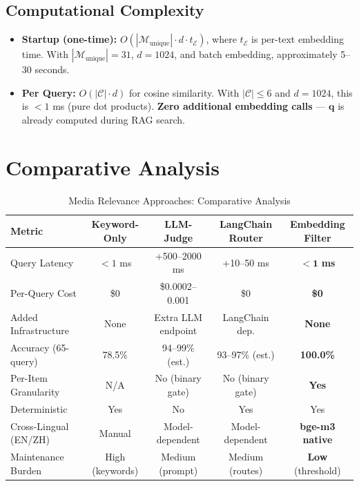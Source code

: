 \documentclass{article}
\begin{document}
\subsection{Computational Complexity}

\begin{itemize}
  \item \textbf{Startup (one-time):} $O(|\mathcal{M}_{\text{unique}}| \cdot d \cdot t_{\mathcal{E}})$, where $t_{\mathcal{E}}$ is per-text embedding time. With $|\mathcal{M}_{\text{unique}}| = 31$, $d = 1024$, and batch embedding, approximately 5--30 seconds.
  \item \textbf{Per Query:} $O(|\mathcal{C}| \cdot d)$ for cosine similarity. With $|\mathcal{C}| \leq 6$ and $d = 1024$, this is $< 1$ ms (pure dot products). \textbf{Zero additional embedding calls} — $\mathbf{q}$ is already computed during RAG search.
\end{itemize}

\section{Comparative Analysis}

\begin{table}[h]
  \caption{Media Relevance Approaches: Comparative Analysis}
  \label{tab:comparison}
  \centering
  \small
  \begin{tabular}{lcccc}
    \toprule
    \textbf{Metric} & \textbf{Keyword-Only} & \textbf{LLM-Judge} & \textbf{LangChain Router} & \textbf{Embedding Filter} \\
    \midrule
    Query Latency & $<1$ ms & +500--2000 ms & +10--50 ms & $\mathbf{<1}$ \textbf{ms} \\
    Per-Query Cost & \$0 & \$0.0002--0.001 & \$0 & \textbf{\$0} \\
    Added Infrastructure & None & Extra LLM endpoint & LangChain dep. & \textbf{None} \\
    Accuracy (65-query) & 78.5\% & 94--99\% (est.) & 93--97\% (est.) & \textbf{100.0\%} \\
    Per-Item Granularity & N/A & No (binary gate) & No (binary gate) & \textbf{Yes} \\
    Deterministic & Yes & No & Yes & Yes \\
    Cross-Lingual (EN/ZH) & Manual & Model-dependent & Model-dependent & \textbf{bge-m3 native} \\
    Maintenance Burden & High (keywords) & Medium (prompt) & Medium (routes) & \textbf{Low} (threshold) \\
    \bottomrule
  \end{tabular}
\end{table}
\end{document}

